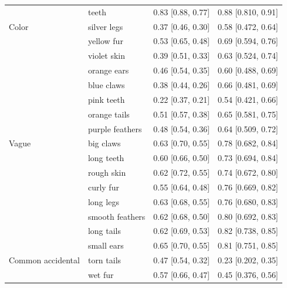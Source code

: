 \documentclass[10pt,letterpaper]{article}
\begin{document}
\begin{table}[h]
\begin{tabular}{| l || l | l | l |}
                  & teeth              & 0.83 {[}0.88, 0.77{]}   & 0.88 {[}0.810, 0.91{]}       \\
Color             & silver legs        & 0.37 {[}0.46, 0.30{]}   & 0.58 {[}0.472, 0.64{]}       \\
                  & yellow fur         & 0.53 {[}0.65, 0.48{]}   & 0.69 {[}0.594, 0.76{]}       \\
                  & violet skin        & 0.39 {[}0.51, 0.33{]}   & 0.63 {[}0.524, 0.74{]}       \\
                  & orange ears        & 0.46 {[}0.54, 0.35{]}   & 0.60 {[}0.488, 0.69{]}       \\
                  & blue claws         & 0.38 {[}0.44, 0.26{]}   & 0.66 {[}0.481, 0.69{]}       \\
                  & pink teeth         & 0.22 {[}0.37, 0.21{]}   & 0.54 {[}0.421, 0.66{]}       \\
                  & orange tails       & 0.51 {[}0.57, 0.38{]}   & 0.65 {[}0.581, 0.75{]}       \\
                  & purple feathers    & 0.48 {[}0.54, 0.36{]}   & 0.64 {[}0.509, 0.72{]}       \\
Vague             & big claws          & 0.63 {[}0.70, 0.55{]}   & 0.78 {[}0.682, 0.84{]}       \\
                  & long teeth         & 0.60 {[}0.66, 0.50{]}   & 0.73 {[}0.694, 0.84{]}       \\
                  & rough skin         & 0.62 {[}0.72, 0.55{]}   & 0.74 {[}0.672, 0.80{]}       \\
                  & curly fur          & 0.55 {[}0.64, 0.48{]}   & 0.76 {[}0.669, 0.82{]}       \\
                  & long legs          & 0.63 {[}0.68, 0.55{]}   & 0.76 {[}0.680, 0.83{]}       \\
                  & smooth feathers    & 0.62 {[}0.68, 0.50{]}   & 0.80 {[}0.692, 0.83{]}       \\
                  & long tails         & 0.62 {[}0.69, 0.53{]}   & 0.82 {[}0.738, 0.85{]}       \\
                  & small ears         & 0.65 {[}0.70, 0.55{]}   & 0.81 {[}0.751, 0.85{]}       \\
Common accidental & torn tails         & 0.47 {[}0.54, 0.32{]}   & 0.23 {[}0.202, 0.35{]}       \\
                  & wet fur            & 0.57 {[}0.66, 0.47{]}   & 0.45 {[}0.376, 0.56{]}       \\

\end{tabular}
\end{table}
\end{document}
